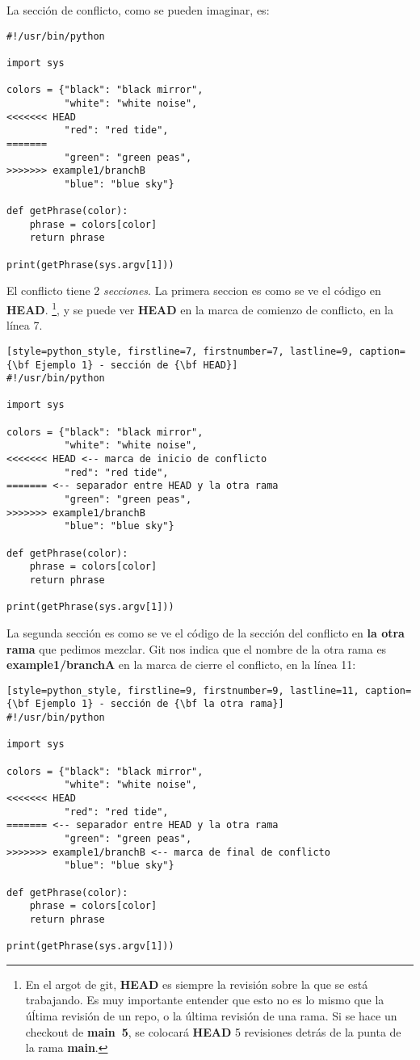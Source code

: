 La sección de conflicto, como se pueden imaginar, es:
\begin{lstlisting}[style=python_style, firstline=7, firstnumber=7, lastline=11, caption={\bf Ejemplo 1} - Sección en conflicto]
#!/usr/bin/python

import sys

colors = {"black": "black mirror",
          "white": "white noise",
<<<<<<< HEAD
          "red": "red tide",
=======
          "green": "green peas",
>>>>>>> example1/branchB
          "blue": "blue sky"}

def getPhrase(color):
    phrase = colors[color]
    return phrase

print(getPhrase(sys.argv[1]))
\end{lstlisting}

El conflicto tiene 2 {\it secciones}. La primera seccion es como se ve el código en {\bf HEAD}.
\footnote{En el argot de git, {\bf HEAD} es siempre la revisión sobre la que se está trabajando. Es muy importante entender
que esto no es lo mismo que la úĺtima revisión de un repo, o la última revisión de una rama. Si se hace un checkout de
{\bf main~5}, se colocará {\bf HEAD} 5 revisiones detrás de la punta de la rama {\bf main}.}, y se puede ver {\bf HEAD} en la
marca de comienzo de conflicto, en la línea 7.

\begin{lstlisting}[style=python_style, firstline=7, firstnumber=7, lastline=9, caption={\bf Ejemplo 1} - sección de {\bf HEAD}]
#!/usr/bin/python

import sys

colors = {"black": "black mirror",
          "white": "white noise",
<<<<<<< HEAD <-- marca de inicio de conflicto
          "red": "red tide",
======= <-- separador entre HEAD y la otra rama
          "green": "green peas",
>>>>>>> example1/branchB
          "blue": "blue sky"}

def getPhrase(color):
    phrase = colors[color]
    return phrase

print(getPhrase(sys.argv[1]))
\end{lstlisting}

La segunda sección es como se ve el código de la sección del conflicto en {\bf la otra rama} que pedimos mezclar. Git
nos indica que el nombre de la otra rama es {\bf example1/branchA} en la marca de cierre el conflicto, en la línea 11:

\begin{lstlisting}[style=python_style, firstline=9, firstnumber=9, lastline=11, caption={\bf Ejemplo 1} - sección de {\bf la otra rama}]
#!/usr/bin/python

import sys

colors = {"black": "black mirror",
          "white": "white noise",
<<<<<<< HEAD
          "red": "red tide",
======= <-- separador entre HEAD y la otra rama
          "green": "green peas",
>>>>>>> example1/branchB <-- marca de final de conflicto
          "blue": "blue sky"}

def getPhrase(color):
    phrase = colors[color]
    return phrase

print(getPhrase(sys.argv[1]))
\end{lstlisting}

